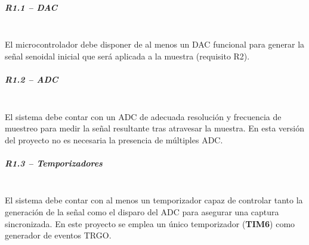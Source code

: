 \documentclass[11pt,a4paper]{article}
\newcommand{\mysubparagraph}[1]{\subparagraph{#1}\mbox{}\\}
\begin{document}
\mysubparagraph{R1.1 – DAC}
El microcontrolador debe disponer de al menos un DAC funcional para generar la señal senoidal inicial que será aplicada a la muestra (requisito R2).

\mysubparagraph{R1.2 – ADC}
El sistema debe contar con un ADC de adecuada resolución y frecuencia de muestreo para medir la señal resultante tras atravesar la muestra. En esta versión del proyecto no es necesaria la presencia de múltiples ADC.

\mysubparagraph{R1.3 – Temporizadores}
El sistema debe contar con al menos un temporizador capaz de controlar tanto la generación de la señal como el disparo del ADC para asegurar una captura sincronizada. En este proyecto se emplea un único temporizador (\textbf{TIM6}) como generador de eventos TRGO.

\end{document}
